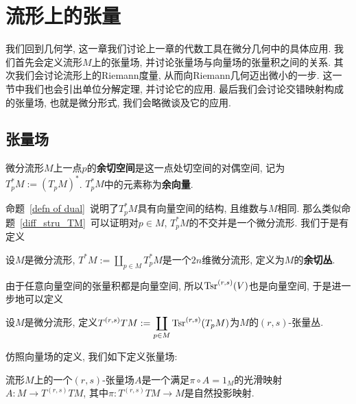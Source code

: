 \chapter{流形上的张量}
我们回到几何学, 这一章我们讨论上一章的代数工具在微分几何中的具体应用.
我们首先会定义流形$M$上的张量场, 并讨论张量场与向量场的张量积之间的关系.
其次我们会讨论流形上的Riemann度量, 从而向Riemann几何迈出微小的一步.
这一节中我们也会引出单位分解定理, 并讨论它的应用.
最后我们会讨论交错映射构成的张量场, 也就是微分形式, 我们会略微谈及它的应用.

\section{张量场}
\begin{defn}
    微分流形$M$上一点$p$的\textbf{余切空间}是这一点处切空间的对偶空间, 记为$T^*_pM:=(T_pM)^*$.
    $T^*_pM$中的元素称为\textbf{余向量}.
\end{defn}

命题~\ref{defn of dual}~说明了$T^*_pM$具有向量空间的结构, 且维数与$M$相同.
那么类似命题~\ref{diff_stru_TM}~可以证明对$p\in M$, $T^*_pM$的不交并是一个微分流形.
我们于是有定义
\begin{defn}
    设$M$是微分流形, $\displaystyle T^*M:=\coprod_{p\in M}T^*_pM$是一个$2n$维微分流形, 定义为$M$的\textbf{余切丛}.
\end{defn}

由于任意向量空间的张量积都是向量空间, 所以$\operatorname{Tsr}^{(r,s)}(V)$也是向量空间, 于是进一步地可以定义
\begin{defn}
    设$M$是微分流形, 定义$\displaystyle T^{(r,s)}TM:=\coprod_{p\in M}\operatorname{Tsr}^{(r,s)}(T_pM)$为$M$的$(r,s)$-张量丛.
\end{defn}

仿照向量场的定义, 我们如下定义张量场:
\begin{defn}
    流形$M$上的一个$(r,s)$-张量场$A$是一个满足$\pi\circ A=1_M$的光滑映射$A:M\to T^{(r,s)}TM$, 其中$\pi:T^{(r,s)}TM\to M$是自然投影映射.
\end{defn}

